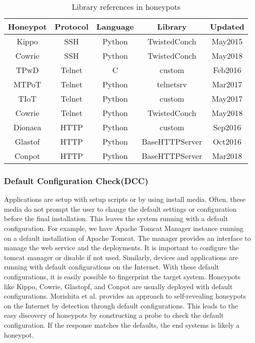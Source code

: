 \begin{table}
\begin{tabular}{||c c c c c||} 
 \hline
 Honeypot & Protocol & Language & Library & Updated \\ [0.5ex] 
 \hline
 Kippo  & SSH    & Python &  TwistedConch & May2015 \\ 
 Cowrie & SSH    & Python &  TwistedConch & May2018 \\
 TPwD   & Telnet & C      &  custom       & Feb2016 \\
 MTPoT  & Telnet & Python &  telnetsrv    & Mar2017 \\
 TIoT   & Telnet & Python &  custom       & May2017 \\
 Cowrie & Telnet & Python &  TwistedConch & May2018 \\
 Dionaea& HTTP   & Python &  custom       & Sep2016 \\
 Glastof& HTTP   & Python &  BaseHTTPServer& Oct2016 \\
 Conpot & HTTP   & Python &  BaseHTTPServer& Mar2018 \\ [1ex] 
 \hline
\end{tabular}
\caption{Library references in honeypots}
\label{library}
\end{table}



\subsubsection{Default Configuration Check(DCC)}
Applications are setup with setup scripts or by using install media. Often, these media do not prompt the user to change the default settings or configuration before the final installation. This leaves the system running with a default configuration. For example, we have Apache Tomcat Manager instance running on a default installation of Apache Tomcat. The manager provides an interface to manage the web service and the deployments. It is important to configure the tomcat manager or disable if not used. Similarly, devices and applications are running with default configurations on the Internet. With these default configurations, it is easily possible to fingerprint the target system. Honeypots like Kippo, Cowrie, Glastopf, and Conpot are usually deployed with default configurations. Morishita et al. \cite{morishita} provides an approach to self-revealing honeypots on the Internet by detection through default configurations.  This leads to the easy discovery of honeypots by constructing a probe to check the default configuration. If the response matches the defaults, the end systems is likely a honeypot.
\newline
